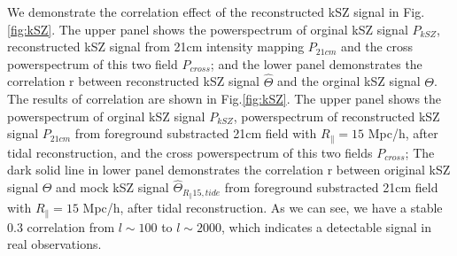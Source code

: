 We demonstrate the correlation effect of the reconstructed kSZ signal in
Fig.\ref{fig:kSZ}. The upper panel shows the powerspectrum of orginal kSZ signal $P_{kSZ}$, reconstructed kSZ signal from 21cm intensity mapping $P_{21cm}$ and the cross powerspectrum of this two field $P_{cross}$; 
and the lower panel demonstrates the correlation r between reconstructed kSZ signal $\hat\Theta$ and the orginal kSZ signal $\Theta$. 
The results of correlation are shown in Fig.\ref{fig:kSZ}.
The upper panel shows the powerspectrum of orginal kSZ signal $P_{kSZ}$, 
		powerspectrum of reconstructed kSZ signal $P_{21cm}$ from foreground
		substracted 21cm field with $R_\parallel = 15$ Mpc/h, after tidal
		reconstruction, 
		and the cross powerspectrum of this two fields $P_{cross}$; 		
The dark solid line in lower panel demonstrates the correlation r between original kSZ signal
		$\Theta$ and mock kSZ signal $\hat\Theta_{R_\parallel 15,tide}$ from
foreground substracted 21cm field with $R_\parallel = 15$ Mpc/h, after tidal
reconstruction.
As we can see, we have a stable 0.3 correlation from $l\sim 100$ to $l\sim 2000$, which indicates a detectable signal in real observations.


